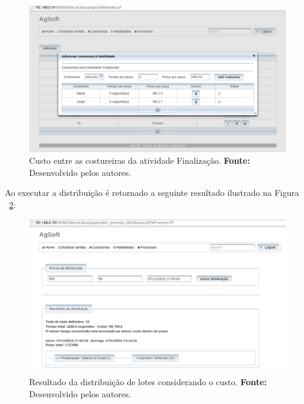 \newpage

\begin{figure}[h!]
	\centerline{\includegraphics[scale=0.3]{./imagens/custo_entre_costureiras_teste2.png}}
	\caption[Custo entre as costureiras da atividade Finalização.]
	{Custo entre as costureiras da atividade Finalização. \textbf{Fonte:}
	Desenvolvido pelos autores.}
	\label{fig:custo_entre_costureiras}
\end{figure}

\par Ao executar a distribuição é retornado a seguinte resultado ilustrado na Figura ~\ref{fig:resultado_custo}:



\begin{figure}[h!]
	\centerline{\includegraphics[scale=0.3]{./imagens/resultado_teste2.png}}
	\caption[Resultado da distribuição de lotes considerando o custo.]
	{Resultado da distribuição de lotes considerando o custo. \textbf{Fonte:}
	Desenvolvido pelos autores.}
	\label{fig:resultado_custo}
\end{figure}

